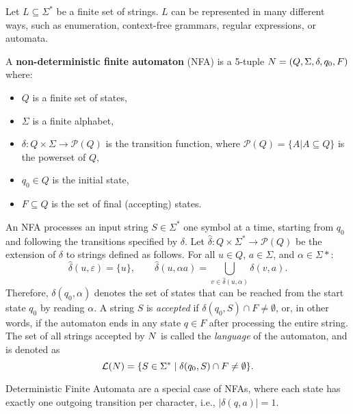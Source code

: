 Let $L \subseteq \Sigma^*$ be a finite set of strings. $L$ can be represented in many different ways, such as enumeration, context-free grammars, regular expressions, or automata.

\begin{definition} \label{def:nfa}
    A \textbf{non-deterministic finite automaton} (NFA) is a 5-tuple $N = (Q, \Sigma, \delta, q_0, F)$ where:
    \begin{itemize}
        \item $Q$ is a finite set of states,
        \item $\Sigma$ is a finite alphabet,
        \item $\delta: Q \times \Sigma \to \mathcal{P}(Q)$ is the transition function, where $\mathcal{P}(Q) = \{A | A \subseteq Q \}$ is the powerset of $Q$,
        \item $q_0 \in Q$ is the initial state,
        \item $F \subseteq Q$ is the set of final (accepting) states.
    \end{itemize}
\end{definition}

An NFA processes an input string $S \in \Sigma^*$ one symbol at a time, starting from $q_0$ and following the transitions specified by $\delta$.
Let $\hat\delta: Q \times \Sigma^* \to \mathcal{P}(Q)$ be the extension of $\delta$ to strings defined as follows.
For all $u \in Q$, $a \in \Sigma$, and $\alpha \in \Sigma*$:
\[
\hat\delta(u,\varepsilon)=\{u\}, \qquad
\hat\delta(u,\alpha a)=\bigcup_{v \in \hat\delta(u,\alpha)} \delta(v,a).
\]
Therefore, $\delta(q_0,\alpha)$ denotes the set of states that can be reached from the start state $q_0$ by reading $\alpha$.
A string $S$ is \emph{accepted} if $\delta(q_0, S)\cap F \neq \emptyset$, or, in other words, if the automaton ends in any state $q \in F$ after processing the entire string.
The set of all strings accepted by $N$ is called the \emph{language} of the automaton, and is denoted as
\[
\mathcal{L}(N)=\{S \in \Sigma^* \mid \delta(q_0, S)\cap F \neq \emptyset\}.
\]

Deterministic Finite Automata are a special case of NFAs, where each state has exactly one outgoing transition per character, i.e., $|\delta(q, a)| = 1$.

